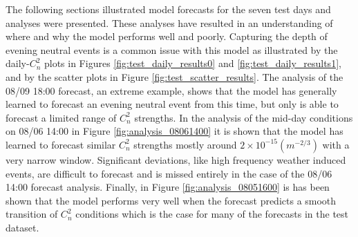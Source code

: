 The following sections illustrated model forecasts for the seven test days and analyses were presented. These analyses have resulted in an understanding of where and why the model performs well and poorly. Capturing the depth of evening neutral events is a common issue with this model as illustrated by the daily-$C_{n}^{2}$ plots in Figures \ref{fig:test_daily_results0} and \ref{fig:test_daily_results1}, and by the scatter plots in Figure \ref{fig:test_scatter_results}. The analysis of the 08/09 18:00 forecast, an extreme example, shows that the model has generally learned to forecast an evening neutral event from this time, but only is able to forecast a limited range of $C_{n}^{2}$ strengths. In the analysis of the mid-day conditions on 08/06 14:00 in Figure \ref{fig:analysis_08061400} it is shown that the model has learned to forecast similar $C_{n}^{2}$ strengths mostly around $2 \times 10^{-15} (m^{-2/3})$ with a very narrow window. Significant deviations, like high frequency weather induced events, are difficult to forecast and is missed entirely in the case of the 08/06 14:00 forecast analysis. Finally, in Figure \ref{fig:analysis_08051600} is has been shown that the model performs very well when the forecast predicts a smooth transition of $C_{n}^{2}$ conditions which is the case for many of the forecasts in the test dataset. 